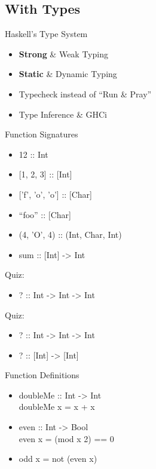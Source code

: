 \documentclass{beamer}                  %
\newcommand{\srule}{
	\rule{\textwidth}{1pt}\\
}
\newlength{\subsecwidth}
\newenvironment{slide}{
	\begin{frame} %
	\settowidth{\subsecwidth}{\insertsubsection} %
	\ifthenelse{\dimtest{\subsecwidth}{<}{1pt}}{ %
		\frametitle{\insertsection\\             %
		\vspace{-1ex}                            %
		\color{fore}\srule                       %
		\par                                     %
		\vspace{-3ex}                            %
		}
	}{                                           %
		\frametitle{\insertsection\ -- \insertsubsection\\ %
		\vspace{-1ex}                            %
		\color{fore}\srule                       %
		\par                                     %
		\vspace{-3ex}                            %
		}
	}
	\Large                                       %
}{
	\end{frame}
}
\begin{document}
\subsection{With Types}

\begin{slide}
  Haskell's Type System
  \begin{itemize}
    \item \textbf{Strong} \& Weak Typing
    \item \textbf{Static} \& Dynamic Typing
    \item Typecheck instead of ``Run \& Pray''
    \item Type Inference \& GHCi
  \end{itemize}
\end{slide}

\begin{slide}
  Function Signatures
  \begin{itemize}
    \item 12 :: Int
    \item{}{} [1, 2, 3] :: [Int]
    \item{}{} ['f', 'o', 'o'] :: [Char]
    \item ``foo'' :: [Char]
    \item (4, 'O', 4) :: (Int, Char, Int)
    \item sum :: [Int] -> Int
  \end{itemize}
\end{slide}

\begin{slide}
  Quiz:\\
  \begin{itemize}
    \item ? :: Int -> Int -> Int
  \end{itemize}
\end{slide}

\begin{slide}
  Quiz:\\
  \begin{itemize}
    \item ? :: Int -> Int -> Int
    \item ? :: [Int] -> [Int]
  \end{itemize}
\end{slide}

\begin{slide}
  Function Definitions
  \begin{itemize}
    \item
      doubleMe :: Int -> Int\\
      doubleMe x = x + x
    \item
      even :: Int -> Bool\\
      even x = (mod x 2) == 0
    \item
      odd x = not (even x)
  \end{itemize}
\end{slide}
\end{document}

